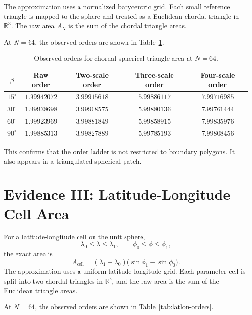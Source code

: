 \documentclass[11pt]{article}
\begin{document}
The approximation uses a normalized barycentric grid.  Each small reference
triangle is mapped to the sphere and treated as a Euclidean chordal triangle
in $\mathbb{R}^3$.  The raw area $A_N$ is the sum of the chordal triangle
areas.

At $N=64$, the observed orders are shown in
Table~\ref{tab:triangle-orders}.

\begin{table}[ht]
\centering
\small
\begin{tabular}{ccccc}
\toprule
$\beta$ & Raw order & Two-scale order & Three-scale order & Four-scale order \\
\midrule
$15^\circ$ & $1.99942072$ & $3.99915618$ & $5.99886117$ & $7.99716985$ \\
$30^\circ$ & $1.99938698$ & $3.99908575$ & $5.99880136$ & $7.99761444$ \\
$60^\circ$ & $1.99923969$ & $3.99881849$ & $5.99858915$ & $7.99835976$ \\
$90^\circ$ & $1.99885313$ & $3.99827889$ & $5.99785193$ & $7.99808456$ \\
\bottomrule
\end{tabular}
\caption{Observed orders for chordal spherical triangle area at $N=64$.}
\label{tab:triangle-orders}
\end{table}

This confirms that the order ladder is not restricted to boundary polygons.
It also appears in a triangulated spherical patch.

\section{Evidence III: Latitude-Longitude Cell Area}

For a latitude-longitude cell on the unit sphere,
\[
  \lambda_0 \leq \lambda \leq \lambda_1,
  \qquad
  \phi_0 \leq \phi \leq \phi_1,
\]
the exact area is
\[
  A_{\mathrm{cell}}
  =
  (\lambda_1-\lambda_0)
  \bigl(\sin\phi_1-\sin\phi_0\bigr).
\]
The approximation uses a uniform latitude-longitude grid.  Each parameter
cell is split into two chordal triangles in $\mathbb{R}^3$, and the raw area
is the sum of the Euclidean triangle areas.

At $N=64$, the observed orders are shown in
Table~\ref{tab:latlon-orders}.
\end{document}

